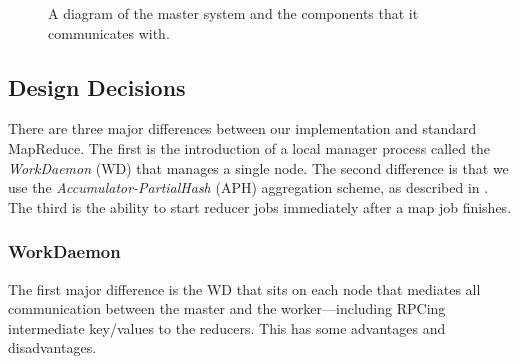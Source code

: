 \documentclass[10pt,letter,final,article,twocolumn]{article} %
\begin{document}
\begin{figure}[htbp]
\begin{center}
\caption{A diagram of the master system and the components that it communicates with.}
\label{fig:master}
\end{center}
\end{figure}

\subsection{Design Decisions}

There are three major differences between our implementation and standard MapReduce. The first is the introduction of a local manager process called the \emph{WorkDaemon} (WD) that manages a single node. The second difference is that we use the \emph{Accumulator-PartialHash} (APH) aggregation scheme, as described in \citet{yu2009distributed}.  The third is the ability to start reducer jobs immediately after a map job finishes.

\subsubsection{WorkDaemon}

The first major difference is the WD that sits on each node that mediates all communication between the master and the worker---including RPCing intermediate key/values to the reducers. This has some advantages and disadvantages.
\end{document}
